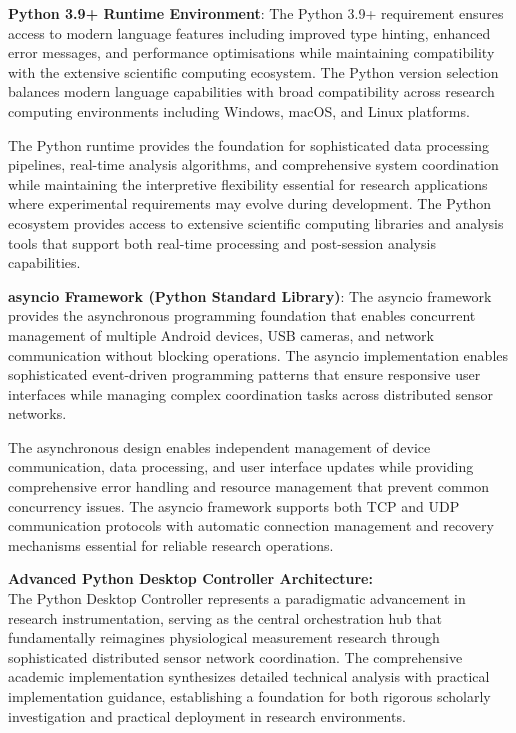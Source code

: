 \documentclass[11pt,a4paper]{report}
\begin{document}
\noindent \textbf{Python 3.9+ Runtime Environment}: The Python 3.9+ requirement ensures access to modern language features including improved type hinting, enhanced error messages, and performance optimisations while maintaining compatibility with the extensive scientific computing ecosystem. The Python version selection balances modern language capabilities with broad compatibility across research computing environments including Windows, macOS, and Linux platforms.

The Python runtime provides the foundation for sophisticated data processing pipelines, real-time analysis algorithms, and comprehensive system coordination while maintaining the interpretive flexibility essential for research applications where experimental requirements may evolve during development. The Python ecosystem provides access to extensive scientific computing libraries and analysis tools that support both real-time processing and post-session analysis capabilities.

\noindent \textbf{asyncio Framework (Python Standard Library)}: The asyncio framework provides the asynchronous programming foundation that enables concurrent management of multiple Android devices, USB cameras, and network communication without blocking operations. The asyncio implementation enables sophisticated event-driven programming patterns that ensure responsive user interfaces while managing complex coordination tasks across distributed sensor networks.

The asynchronous design enables independent management of device communication, data processing, and user interface updates while providing comprehensive error handling and resource management that prevent common concurrency issues. The asyncio framework supports both TCP and UDP communication protocols with automatic connection management and recovery mechanisms essential for reliable research operations.

\noindent \textbf{Advanced Python Desktop Controller Architecture:}\\

The Python Desktop Controller represents a paradigmatic advancement in research instrumentation, serving as the central orchestration hub that fundamentally reimagines physiological measurement research through sophisticated distributed sensor network coordination. The comprehensive academic implementation synthesizes detailed technical analysis with practical implementation guidance, establishing a foundation for both rigorous scholarly investigation and practical deployment in research environments.
\end{document}
